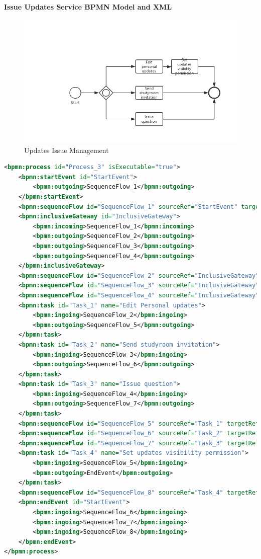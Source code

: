 \documentclass[runningheads]{llncs}
\begin{document}
\textbf{Issue Updates Service BPMN Model and XML}
\begin{figure}
  \centering
  \includegraphics[width=1\textwidth]{figure/pmz/UpdatesIssueManagement.png}
  \caption{Updates Issue Management}
\end{figure}
\begin{lstlisting}[language={XML}]
<bpmn:process id="Process_3" isExecutable="true">
	<bpmn:startEvent id="StartEvent">
        <bpmn:outgoing>SequenceFlow_1</bpmn:outgoing>
    </bpmn:startEvent>
    <bpmn:sequenceFlow id="SequenceFlow_1" sourceRef="StartEvent" targetRef="InclusiveGateway" />
    <bpmn:inclusiveGateway id="InclusiveGateway">
        <bpmn:incoming>SequenceFlow_1</bpmn:incoming>
        <bpmn:outgoing>SequenceFlow_2</bpmn:outgoing>
        <bpmn:outgoing>SequenceFlow_3</bpmn:outgoing>
        <bpmn:outgoing>SequenceFlow_4</bpmn:outgoing>
    </bpmn:inclusiveGateway>
    <bpmn:sequenceFlow id="SequenceFlow_2" sourceRef="InclusiveGateway" targetRef="Task_1" />
    <bpmn:sequenceFlow id="SequenceFlow_3" sourceRef="InclusiveGateway" targetRef="Task_2" />
    <bpmn:sequenceFlow id="SequenceFlow_4" sourceRef="InclusiveGateway" targetRef="Task_3" />
    <bpmn:task id="Task_1" name="Edit Personal updates">
    	<bpmn:ingoing>SequenceFlow_2</bpmn:ingoing>
    	<bpmn:outgoing>SequenceFlow_5</bpmn:outgoing>
    </bpmn:task>
    <bpmn:task id="Task_2" name="Send studyroom invitation">
    	<bpmn:ingoing>SequenceFlow_3</bpmn:ingoing>
    	<bpmn:outgoing>SequenceFlow_6</bpmn:outgoing>
    </bpmn:task>
    <bpmn:task id="Task_3" name="Issue question">
    	<bpmn:ingoing>SequenceFlow_4</bpmn:ingoing>
    	<bpmn:outgoing>SequenceFlow_7</bpmn:outgoing>
    </bpmn:task>
    <bpmn:sequenceFlow id="SequenceFlow_5" sourceRef="Task_1" targetRef="Task_4" />
    <bpmn:sequenceFlow id="SequenceFlow_6" sourceRef="Task_2" targetRef="EndEvent" />
    <bpmn:sequenceFlow id="SequenceFlow_7" sourceRef="Task_3" targetRef="EndEvent" />
    <bpmn:task id="Task_4" name="Set updates visibility permission">
    	<bpmn:ingoing>SequenceFlow_5</bpmn:ingoing>
    	<bpmn:outgoing>EndEvent</bpmn:outgoing>
    </bpmn:task>
    <bpmn:sequenceFlow id="SequenceFlow_8" sourceRef="Task_4" targetRef="EndEvent" />
    <bpmn:endEvent id="StartEvent">
        <bpmn:ingoing>SequenceFlow_6</bpmn:ingoing>
        <bpmn:ingoing>SequenceFlow_7</bpmn:ingoing>
        <bpmn:ingoing>SequenceFlow_8</bpmn:ingoing>
    </bpmn:endEvent>
</bpmn:process>
\end{lstlisting}
\end{document}
